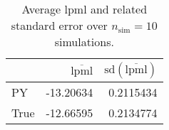 \begin{table}[H]

\caption{Average lpml and related standard error over $n_{\text{sim}} = 10$ simulations.}
\centering
\begin{tabular}[t]{lrr}
\toprule
  & $\overbar{\text{lpml}}$ & $\text{sd}(\overbar{\text{lpml}})$\\
\midrule
PY & -13.20634 & 0.2115434\\
True & -12.66595 & 0.2134774\\
\bottomrule
\end{tabular}
\end{table}